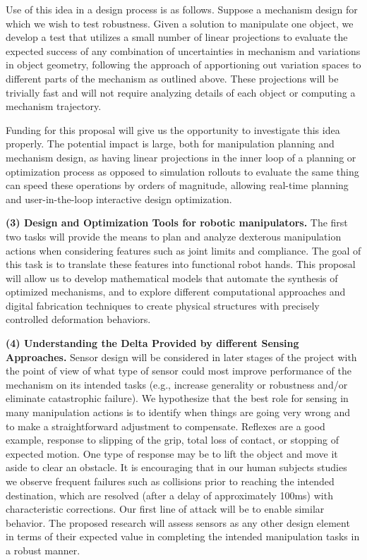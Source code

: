 Use of this idea in a design process is as follows.   Suppose a mechanism design for which we wish to test robustness.    Given a  solution to manipulate one object, we develop a test that utilizes a small number of linear projections to evaluate the expected success of any combination of uncertainties in mechanism and variations in object geometry, following the approach of apportioning out variation spaces to different parts of the mechanism as outlined above.   These projections will be trivially fast and will not require analyzing details of each object or computing a mechanism trajectory.

Funding for this proposal will give us the opportunity to investigate this idea properly.   The potential impact is large, both for manipulation planning and mechanism design, as having linear projections in the inner loop of a planning or optimization process as opposed to simulation rollouts to evaluate the same thing can speed these operations by orders of magnitude, allowing real-time planning and user-in-the-loop interactive design optimization.

\smallskip\noindent
{\bf (3) Design and Optimization Tools for robotic manipulators.} The first two tasks will provide the means to plan and analyze dexterous manipulation actions when considering features such as joint limits and compliance. The goal of this task is to translate these features into functional robot hands. This proposal will allow us to develop mathematical models that automate the synthesis of optimized mechanisms, and to explore different computational approaches and digital fabrication techniques to create physical structures with precisely controlled deformation behaviors.

 \smallskip\noindent
{\bf (4) Understanding the Delta Provided by different Sensing Approaches.}   Sensor design will be considered in later stages of the project with the point of view of what type of sensor could most improve performance of the mechanism on its intended tasks (e.g., increase generality or robustness and/or eliminate catastrophic failure).   We hypothesize that the best role for sensing in many manipulation actions is to identify when things are going very wrong and to make a straightforward adjustment to compensate.   Reflexes are a good example, response to slipping of the grip, total loss of contact, or stopping of expected motion.   One type of response may be to  lift the object and move it aside to clear an obstacle.     It is encouraging that in our human subjects studies we observe frequent failures such as collisions prior to reaching the intended destination, which are resolved (after a delay of approximately 100ms) with characteristic corrections.    Our first line of attack will be to enable similar behavior.  The proposed research  will assess sensors as any other design element in terms of their expected value in completing the intended manipulation tasks in a robust manner.

     


